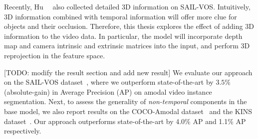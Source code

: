 Recently, Hu~\etal~\cite{HuCVPR2021} also collected detailed 3D information on SAIL-VOS. Intuitively, 3D information combined with temporal information will offer more clue for objects and their occlusion. Therefore, this thesis explores the effect of adding 3D information to the video data.  In particular, the model will incorporate depth map and camera intrinsic and extrinsic matrices into the input, and perform 3D reprojection in the feature space.

[TODO: modify the result section and add new result]
We evaluate our approach on the SAIL-VOS dataset~\cite{hu2019sail}, where we outperform state-of-the-art by $3.5\%$ (absolute-gain) in Average Precision (AP) on amodal video instance segmentation. 
Next, to assess the generality of \textit{non-temporal} components in the base model,
we also report results on the COCO-Amodal dataset~\cite{zhu2017semantic} and the KINS dataset~\cite{qi2019amodal}.
Our approach outperforms state-of-the-art by 4.0\% AP and 1.1\% AP respectively.
